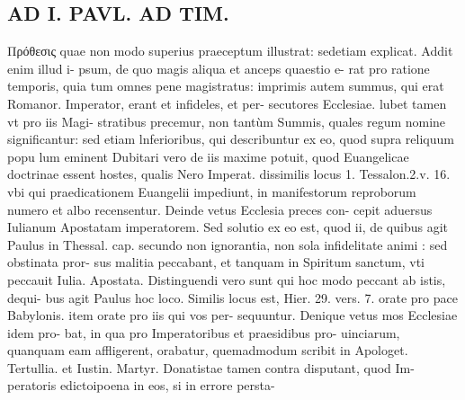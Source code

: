 \documentclass{article}
\begin{document}
\begin{pages}
\section*{AD I. PAVL. AD TIM. }
\marginpar{[ p.48 ]}\pstart Πρόθεσις quae non modo superius praeceptum illustrat: sedetiam explicat. Addit enim illud i- psum, de quo magis aliqua et anceps quaestio e- rat pro ratione temporis, quia tum omnes pene magistratus: imprimis autem summus, qui erat Romanor. Imperator, erant et infideles, et per- secutores Ecclesiae. lubet tamen vt pro iis Magi- stratibus precemur, non tantùm Summis, quales regum nomine significantur: sed etiam lnferioribus, qui describuntur ex eo, quod supra reliquum popu lum eminent Dubitari vero de iis maxime potuit, quod Euangelicae doctrinae essent hostes, qualis Nero Imperat. dissimilis locus 1. Tessalon.2.v. 16. vbi qui praedicationem Euangelii impediunt, in manifestorum reproborum numero et albo recensentur. Deinde vetus Ecclesia preces con- cepit aduersus Iulianum Apostatam imperatorem. Sed solutio ex eo est, quod ii, de quibus agit Paulus in Thessal. cap. secundo non ignorantia, non sola infidelitate animi : sed obstinata pror- sus malitia peccabant, et tanquam in Spiritum sanctum, vti peccauit Iulia. Apostata. Distinguendi vero sunt qui hoc modo peccant ab istis, dequi- bus agit Paulus hoc loco.  \pend\pstart Similis locus est, Hier. 29. vers. 7. orate pro pace Babylonis. item orate pro iis qui vos per- sequuntur. Denique vetus mos Ecclesiae idem pro- bat, in qua pro Imperatoribus et praesidibus pro- uinciarum, quanquam eam affligerent, orabatur, quemadmodum scribit in Apologet. Tertullia. et Iustin. Martyr.  \pend\pstart Donatistae tamen contra disputant, quod Im- peratoris edictoipoena in eos, si in errore persta-  \pend

\end{pages}
\end{document}
